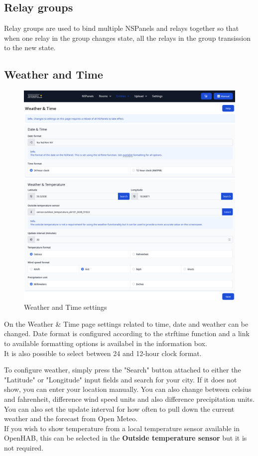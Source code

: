 \documentclass[10pt]{article}
\begin{document}
    \hypertarget{sec:relay_groups}{}
    \subsection{Relay groups}
    Relay groups are used to bind multiple NSPanels and relays together so that when one relay in the group changes state, all the relays in the group transission to the new state.


    \hypertarget{sec:weather_and_time}{}
    \subsection{Weather and Time}
    \begin{figure}[H]
    \centering
    \includegraphics[scale=0.25]{weather_and_time.png}
    \caption{Weather and Time settings}%
    \end{figure}
    On the Weather \& Time page settings related to time, date and weather can be changed. Date format is configured according to the strftime function and a link to available formatting options is availabel in the information box.
    \\It is also possible to select between 24 and 12-hour clock format.

    
    To configure weather, simply press the "Search" button attached to either the "Latitude" or "Longitude" input fields and search for your city. If it does not show, you can enter your location manually.
    You can also change between celsius and fahrenheit, difference wind speed units and also difference precipitation units. You can also set the update interval for how often to pull down the current weather and the forecast from Open Meteo.
    \\
    If you wish to show temperature from a local temperature sensor available in OpenHAB, this can be selected in the \textbf{Outside temperature sensor} but it is not required.
    
\end{document}
